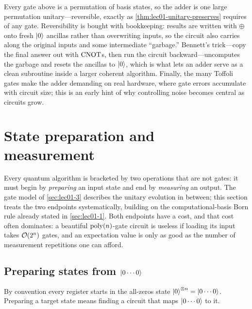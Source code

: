 \begin{remark}
Every gate above is a permutation of basis states, so the adder is one large
permutation unitary---reversible, exactly as \cref{thm:lec01-unitary-preserves}
requires of any gate. Reversibility is bought with bookkeeping: results are
written with $\oplus$ onto fresh $\ket{0}$ ancillas rather than overwriting inputs,
so the circuit also carries along the original inputs and some intermediate
``garbage.'' Bennett's trick---copy the final answer out with $\mathrm{CNOT}$s, then run
the circuit backward---uncomputes the garbage and resets the ancillas to
$\ket{0}$, which is what lets an adder serve as a clean subroutine inside a larger
coherent algorithm. Finally, the many Toffoli gates make the adder demanding on
real hardware, where gate errors accumulate with circuit size; this is an early
hint of why controlling noise becomes central as circuits grow.
\end{remark}

\section{State preparation and measurement}
\label{sec:lec01-prepmeas}

Every quantum algorithm is bracketed by two operations that are not gates: it must
begin by \emph{preparing} an input state and end by \emph{measuring} an output. The
gate model of \cref{sec:lec01-3} describes the unitary evolution in between; this
section treats the two endpoints systematically, building on the computational-basis
Born rule already stated in \cref{sec:lec01-1}. Both endpoints have a cost, and that
cost often dominates: a beautiful $\operatorname{poly}(n)$-gate circuit is useless if loading its
input takes $\mathcal{O}(2^{n})$ gates, and an expectation value is only as good as the
number of measurement repetitions one can afford.

\subsection{Preparing states from \texorpdfstring{$\ket{0\cdots0}$}{|0...0>}}

By convention every register starts in the all-zeros state $\ket{0}^{\otimes n}=\ket{0\cdots0}$.
Preparing a target state means finding a circuit that maps $\ket{0\cdots0}$ to it.

